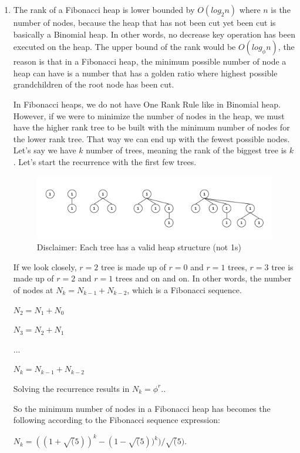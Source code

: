 \documentclass{article}
\begin{document}
\begin{enumerate}
  \item The rank of a Fibonacci heap is lower bounded by $O(log_2n)$ where $n$ is the number of nodes, because the heap that has not been cut yet been cut is basically a Binomial heap. In other words, no decrease key operation has been executed on the heap.
  The upper bound of the rank would be $O(log_{\phi}n)$, the reason is that in a Fibonacci heap, the minimum possible number of node a heap can have is a number that has a golden ratio where highest possible grandchildren of the root node has been cut.
  
  In Fibonacci heaps, we do not have One Rank Rule like in Binomial heap. However, if we were to minimize the number of nodes in the
  heap, we must have the higher rank tree to be built with the minimum number of nodes for the lower rank tree. That way we can end up with the fewest possible nodes.
  Let's say we have $k$ number of trees, meaning the rank of the biggest tree is $k$. Let's start the recurrence with the first few trees.

  \begin{figure}[H]
    \includegraphics[width=\textwidth]{image1.png}
    \caption{Disclaimer: Each tree has a valid heap structure (not 1s)}
    \centering
  \end{figure}

  If we look closely, $r=2$ tree is made up of $r=0$ and $r=1$ trees, $r=3$ tree is made up of $r=2$ and $r=1$ trees and on and on.
  In other words, the number of nodes at $N_k=N_{k-1}+N_{k-2}$, which is a Fibonacci sequence.

  $N_2=N_1+N_0$

  $N_3=N_2+N_1$
  
  $...$

  $N_k=N_{k-1}+N_{k-2}$

  Solving the recurrence results in $N_k=\phi^r$.\cite{master}.
  
  So the minimum number of nodes in a Fibonacci heap has becomes the following according to the Fibonacci sequence expression\cite{wiki}:
  
  $N_k=((1+\sqrt(5))^k-(1-\sqrt(5))^k)/\sqrt(5).$


\end{enumerate}
\end{document}
